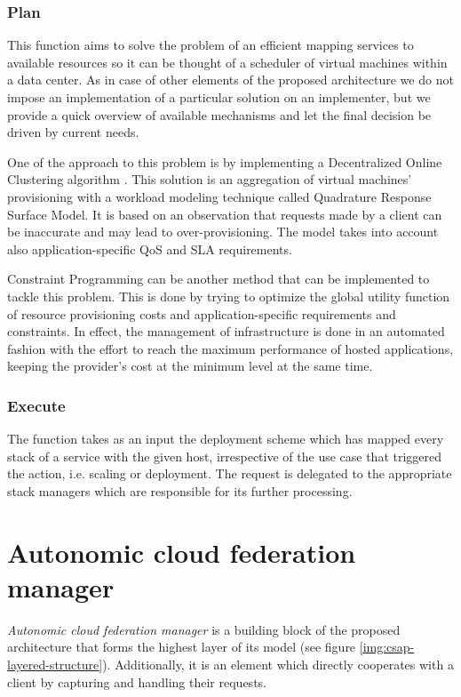 \subsubsection{Plan}
This function aims to solve the problem of an efficient mapping services to available resources so it can be thought of a scheduler of virtual machines within a data center. As in case of other elements of the proposed architecture we do not impose an implementation of a particular solution on an implementer, but we provide a quick overview of available mechanisms and let the final decision be driven by current needs.

One of the approach to this problem is by implementing a Decentralized Online Clustering algorithm \cite{quiroz2009towards}. This solution is an aggregation of virtual machines' provisioning with a workload modeling technique called Quadrature Response Surface Model. It is based on an observation that requests made by a client can be inaccurate and may lead to over-provisioning. The model takes into account also application-specific QoS and SLA requirements.

Constraint Programming can be another method that can be implemented \cite{nguyen2009autonomic} to tackle this problem. This is done by trying to optimize the global utility function of resource provisioning costs and application-specific requirements and constraints. In effect, the management of infrastructure is done in an automated fashion with the effort to reach the maximum performance of hosted applications, keeping the provider's cost at the minimum level at the same time.

\subsubsection{Execute}
The function takes as an input the deployment scheme which has mapped every stack of a service with the given host, irrespective of the use case that triggered the action, i.e. scaling or deployment. The request is delegated to the appropriate stack managers which are responsible for its further processing.

\section{Autonomic cloud federation manager}
\emph{Autonomic cloud federation manager} is a building block of the proposed architecture that forms the highest layer of its model (see figure \ref{img:csap-layered-structure}). Additionally, it is an element which directly cooperates with a client by capturing and handling their requests.

